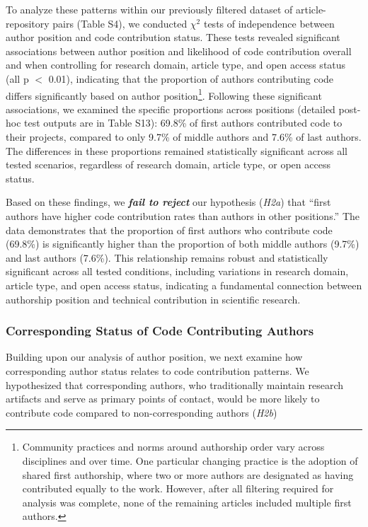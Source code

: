 \documentclass[
  number,
  3p,
  onecolumn]{elsarticle}
\begin{document}
To analyze these patterns within our previously filtered dataset of
article-repository pairs (Table S4), we conducted $\chi^2$ tests of
independence between author position and code contribution status. These
tests revealed significant associations between author position and
likelihood of code contribution overall and when controlling for
research domain, article type, and open access status (all p $<$
0.01), indicating that the proportion of authors contributing code
differs significantly based on author position\footnote{Community
  practices and norms around authorship order vary across disciplines
  and over time. One particular changing practice is the adoption of
  shared first authorship, where two or more authors are designated as
  having contributed equally to the work. However, after all filtering
  required for analysis was complete, none of the remaining articles
  included multiple first authors.}. Following these significant
associations, we examined the specific proportions across positions
(detailed post-hoc test outputs are in Table S13): 69.8\% of first
authors contributed code to their projects, compared to only 9.7\% of
middle authors and 7.6\% of last authors. The differences in these
proportions remained statistically significant across all tested
scenarios, regardless of research domain, article type, or open access
status.

Based on these findings, we \textbf{\emph{fail to reject}} our
hypothesis (\emph{H2a}) that ``first authors have higher code
contribution rates than authors in other positions.'' The data
demonstrates that the proportion of first authors who contribute code
(69.8\%) is significantly higher than the proportion of both middle
authors (9.7\%) and last authors (7.6\%). This relationship remains
robust and statistically significant across all tested conditions,
including variations in research domain, article type, and open access
status, indicating a fundamental connection between authorship position
and technical contribution in scientific research.

\subsubsection{Corresponding Status of Code Contributing
Authors}\label{corresponding-status-of-code-contributing-authors}

Building upon our analysis of author position, we next examine how
corresponding author status relates to code contribution patterns. We
hypothesized that corresponding authors, who traditionally maintain
research artifacts and serve as primary points of contact, would be more
likely to contribute code compared to non-corresponding authors
(\emph{H2b})
\end{document}
